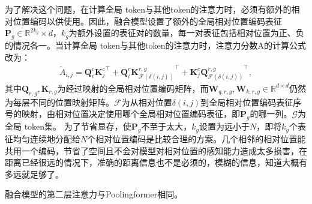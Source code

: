 为了解决这个问题，在计算全局 token与其他token的注意力时，必须有额外的相对位置编码以供使用。因此，融合模型设置了额外的全局相对位置编码表征$\mathbf{P}_g \in \mathbb{R}^{2k_g} \times d$，$k_g$为额外设置的表征对的数量，每一对表征包括相对位置为正、负的情况各一。当计算全局 token与其他token的注意力时，注意力分数A的计算公式改为：
\begin{align}
\widetilde{A}_{i,j}=\mathbf{Q}^c_i {\mathbf{K}^c_j}^\top + \mathbf{Q}^c_i {\mathbf{K}^{r,g}_{\mathcal{F}(\delta(i,j))}}^\top +  \mathbf{K}^c_j {\mathbf{Q}^{r,g}_{\mathcal{F}(\delta(i,j))}}^\top ,
\label{eq:pooldeberta_att_glb}
\end{align}
其中$\mathbf{Q}_{r,g},\mathbf{K}_{r,g}$为经过映射的全局相对位置编码矩阵，而$\mathbf{W}_{q,r,g},\mathbf{W}_{k,r,g} \in \mathbb{R}^{d \times d}$仍然为每层不同的位置映射矩阵。$\mathcal{F}$为从相对位置$\delta(i,j)$到全局相对位置编码表征序号的映射，由相对位置决定使用哪个全局相对位置编码表征，即$\mathbf{P}_g$的哪一列。$\mathcal{G}$为全局 token集。
为了节省显存，使$\mathbf{P}_g$不至于太大，$k_g$设置为远小于$N$，即将$k_g$个表征均匀连续地分配给$N$个相对位置编码是比较合理的方案。几个相邻的相对位置能共用一个编码，节省了空间且不会对模型对相对位置的感知能力造成太多损害，在距离已经很远的情况下，准确的距离信息也不是必须的，模糊的信息，知道大概有多远就足够了。

融合模型的第二层注意力与Poolingformer相同。





